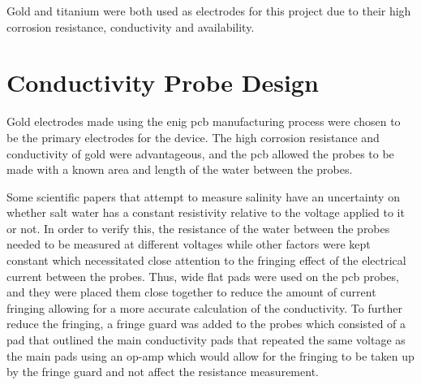 Gold and titanium were both used as electrodes for this project due to their high corrosion resistance, conductivity and availability.

\section{Conductivity Probe Design}

Gold electrodes made using the \gls{enig} \gls{pcb} manufacturing process were chosen to be the primary electrodes for the device.
The high corrosion resistance and conductivity of gold were advantageous, and the \gls{pcb} allowed the probes to be made with a known area and length of the water between the probes.

Some scientific papers that attempt to measure salinity have an uncertainty on whether salt water has a constant resistivity relative to the voltage applied to it or not.
In order to verify this, the resistance of the water between the probes needed to be measured at different voltages while other factors were kept constant which necessitated close attention to the fringing effect of the electrical current between the probes.
Thus, wide flat pads were used on the \gls{pcb} probes, and they were placed them close together to reduce the amount of current fringing allowing for a more accurate calculation of the conductivity.
To further reduce the fringing, a fringe guard was added to the probes which consisted of a pad that outlined the main conductivity pads that repeated the same voltage as the main pads using an op-amp which would allow for the fringing to be taken up by the fringe guard and not affect the resistance measurement.

